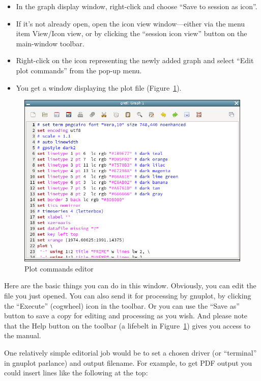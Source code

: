 \begin{itemize}
\item In the graph display window, right-click and choose ``Save to
  session as icon''.
\item If it's not already open, open the icon view window---either
  via the menu item View/Icon view, or by clicking the ``session icon
  view'' button on the main-window toolbar.
\item Right-click on the icon representing the newly added graph and
  select ``Edit plot commands'' from the pop-up menu.
\item You get a window displaying the plot file
  (Figure~\ref{fig:plot-edit}).
\end{itemize}

\begin{figure}[htbp]
  \centering
  \includegraphics[scale=0.6]{figures/plotedit}
  \caption{Plot commands editor}
  \label{fig:plot-edit}
\end{figure}

Here are the basic things you can do in this window.  Obviously, you
can edit the file you just opened.  You can also send it for
processing by gnuplot, by clicking the ``Execute'' (cogwheel) icon in
the toolbar.  Or you can use the ``Save as'' button to save a copy for
editing and processing as you wish. And please note that the Help
button on the toolbar (a lifebelt in Figure~\ref{fig:plot-edit}) gives
you access to the  manual.

One relatively simple editorial job would be to set a chosen driver
(or ``terminal'' in gnuplot parlance) and output filename. For
example, to get PDF output you could insert lines like the following
at the top:

